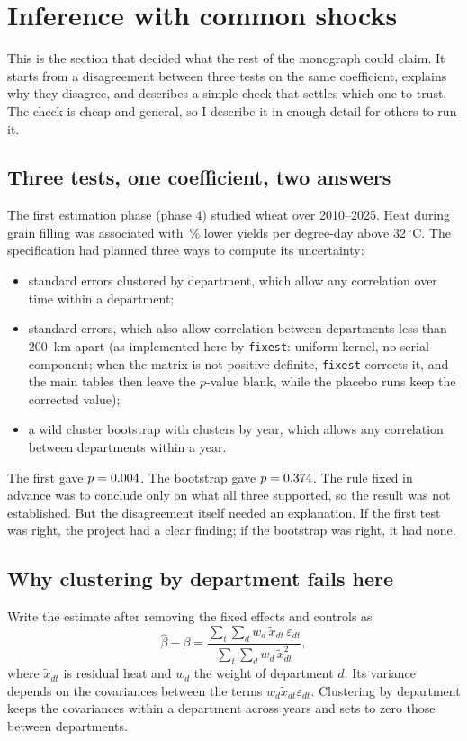 \section{Inference with common shocks}
\label{sec:inference}

This is the section that decided what the rest of the monograph could claim. It starts from a disagreement between three tests on the same coefficient, explains why they disagree, and describes a simple check that settles which one to trust. The check is cheap and general, so I describe it in enough detail for others to run it.

\subsection{Three tests, one coefficient, two answers}

The first estimation phase (phase 4) studied wheat over 2010--2025. Heat during grain filling was associated with \WheatPct\,\% lower yields per degree-day above 32\,$^{\circ}$C. The specification had planned three ways to compute its uncertainty:
\begin{itemize}
  \item standard errors clustered by department, which allow any correlation over time within a department;
  \item \textcite{conley1999} standard errors, which also allow correlation between departments less than 200~km apart (as implemented here by \texttt{fixest}: uniform kernel, no serial component; when the matrix is not positive definite, \texttt{fixest} corrects it, and the main tables then leave the $p$-value blank, while the placebo runs keep the corrected value);
  \item a wild cluster bootstrap with clusters by year, which allows any correlation between departments within a year.
\end{itemize}
The first gave $p = 0.004$. The bootstrap gave $p = 0.374$. The rule fixed in advance was to conclude only on what all three supported, so the result was not established. But the disagreement itself needed an explanation. If the first test was right, the project had a clear finding; if the bootstrap was right, it had none.

\subsection{Why clustering by department fails here}

Write the estimate after removing the fixed effects and controls as
\begin{equation}
\hat\beta - \beta = \frac{\sum_{t}\sum_{d} w_d\, \tilde x_{dt}\, \varepsilon_{dt}}{\sum_t \sum_d w_d\, \tilde x_{dt}^2},
\end{equation}
where $\tilde x_{dt}$ is residual heat and $w_d$ the weight of department $d$. Its variance depends on the covariances between the terms $w_d\tilde x_{dt}\varepsilon_{dt}$. Clustering by department keeps the covariances within a department across years and sets to zero those between departments.

